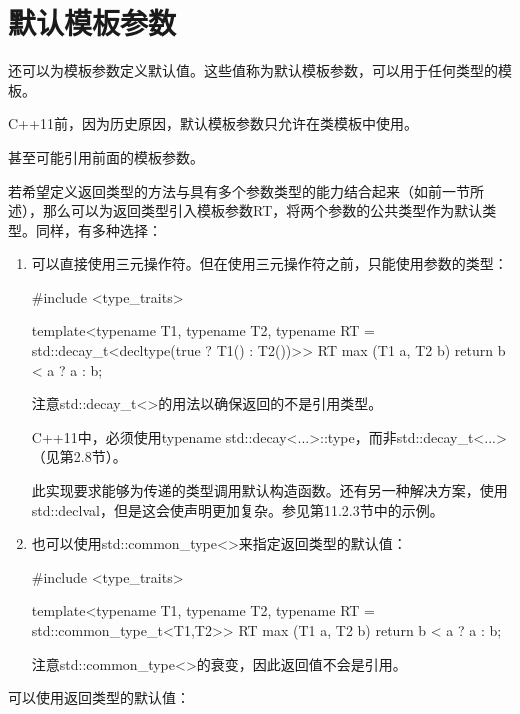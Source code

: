 \section{默认模板参数}

还可以为模板参数定义默认值。这些值称为默认模板参数，可以用于任何类型的模板。

\begin{notice}
C++11前，因为历史原因，默认模板参数只允许在类模板中使用。
\end{notice}

甚至可能引用前面的模板参数。

若希望定义返回类型的方法与具有多个参数类型的能力结合起来（如前一节所述），那么可以为返回类型引入模板参数RT，将两个参数的公共类型作为默认类型。同样，有多种选择：

\begin{enumerate}
\item 
可以直接使用三元操作符。但在使用三元操作符之前，只能使用参数的类型：

\begin{cpp}
#include <type_traits>

template<typename T1, typename T2,
typename RT = std::decay_t<decltype(true ? T1() : T2())>>
RT max (T1 a, T2 b) {
	return b < a ? a : b;
}
\end{cpp}

注意std::decay\_t<>的用法以确保返回的不是引用类型。

\begin{notice}
C++11中，必须使用typename std::decay<...>::type，而非std::decay\_t<...>（见第2.8节）。
\end{notice}

此实现要求能够为传递的类型调用默认构造函数。还有另一种解决方案，使用std::declval，但是这会使声明更加复杂。参见第11.2.3节中的示例。

\item
也可以使用std::common\_type<>来指定返回类型的默认值：

\begin{cpp}
#include <type_traits>

template<typename T1, typename T2,
typename RT = std::common_type_t<T1,T2>>
RT max (T1 a, T2 b) {
	return b < a ? a : b;
}
\end{cpp}

注意std::common\_type<>的衰变，因此返回值不会是引用。
\end{enumerate}

可以使用返回类型的默认值：

